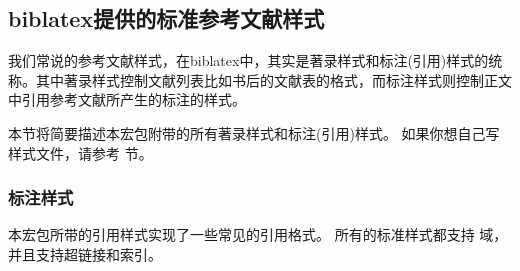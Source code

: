 \subsection{biblatex提供的标准参考文献样式}%
\label{use:xbx}


我们常说的参考文献样式，在biblatex中，其实是著录样式和标注(引用)样式的统称。其中著录样式控制文献列表比如书后的文献表的格式，而标注样式则控制正文中引用参考文献所产生的标注的样式。

本节将简要描述本宏包附带的所有著录样式和标注(引用)样式。
如果你想自己写样式文件，请参考  节。

\subsubsection{标注样式}%
\label{use:xbx:cbx}


本宏包所带的引用样式实现了一些常见的引用格式。
所有的标准样式都支持  域，并且支持超链接和索引。


